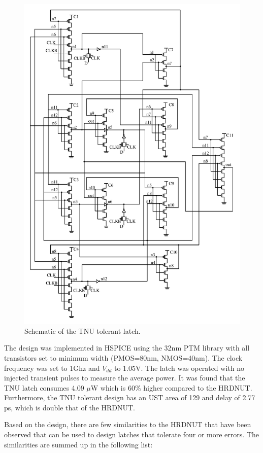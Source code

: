 \begin{figure}[!htbp]
	\centering
	\includegraphics[width=0.90\linewidth]{Figures/TNULatch2}
	\caption{Schematic of the TNU tolerant latch.}
	\label{TNULatch}
\end{figure} 

The design was implemented in HSPICE using the 32nm PTM library with all transistors set to minimum width (PMOS=80nm, NMOS=40nm). The clock frequency was set to 1Ghz and $V_{dd}$ to 1.05V. The latch was operated with no injected transient pulses to measure the average power. It was found that the TNU latch consumes 4.09 $\mu$W which is 60\% higher compared to the HRDNUT. Furthermore, the TNU tolerant design has an UST area of 129 and delay of 2.77 ps, which is double that of the HRDNUT. 

Based on the design, there are few similarities to the HRDNUT that have been observed that can be used to design latches that tolerate four or more errors. The similarities are summed up in the following list:

